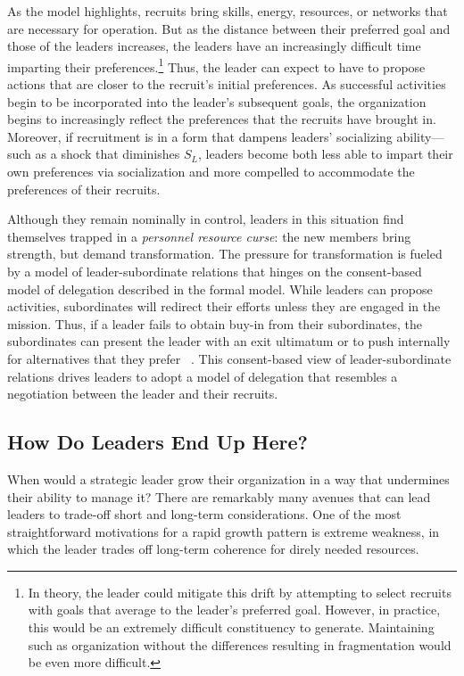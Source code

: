 As the model highlights, recruits bring skills, energy, resources, or networks that are necessary for operation. But as the distance between their preferred goal and those of the leaders increases, the leaders have an increasingly difficult time imparting their preferences.\footnote{In theory, the leader could mitigate this drift by attempting to select recruits with goals that average to the leader's preferred goal. However, in practice, this would be an extremely difficult constituency to generate. Maintaining such as organization without the differences resulting in fragmentation would be even more difficult.} Thus, the leader can expect to have to propose actions that are closer to the recruit's initial preferences. As successful activities begin to be incorporated into the leader's subsequent goals, the organization begins to increasingly reflect the preferences that the recruits have brought in.  Moreover, if recruitment is in a form that dampens leaders' socializing ability--- such as a shock that diminishes $S_{L}$,  leaders become both less able to impart their own preferences via socialization and more compelled to accommodate the preferences of their recruits.

Although they remain nominally in control, leaders in this situation find themselves trapped in a \textit{personnel resource curse}: the new members bring strength, but demand transformation.  The pressure for transformation is fueled by a model of leader-subordinate relations that hinges on the consent-based model of delegation described in the formal model. While leaders can propose activities, subordinates will redirect their efforts unless they are engaged in the mission. Thus, if a leader fails to obtain buy-in from their subordinates, the subordinates can present the leader with an exit ultimatum or to push internally for alternatives that they prefer  ~\autocite{hirschman1970exit}.  This consent-based view of leader-subordinate relations drives leaders to adopt a model of delegation that resembles a negotiation between the leader and their recruits.%

\subsection{How Do Leaders End Up Here?}

When would a strategic leader grow their organization in a way that undermines their ability to manage it? There are remarkably many avenues that can lead leaders to trade-off short and long-term considerations. One of the most straightforward motivations for a rapid growth pattern is extreme weakness, in which the leader trades off long-term coherence for direly needed resources.

